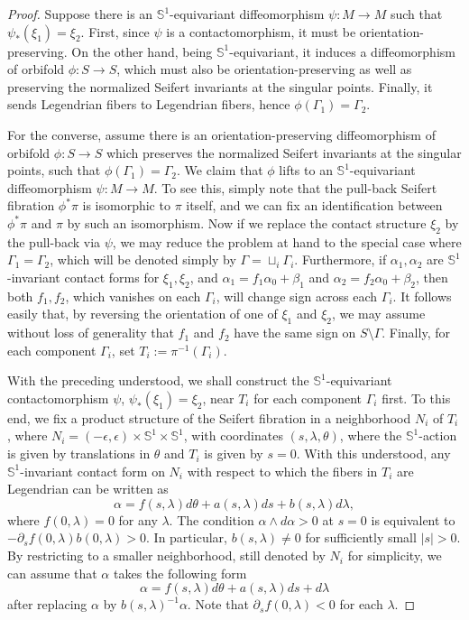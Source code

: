 \documentclass[11pt]{amsart}
\theoremstyle{plain}
\numberwithin{theorem}{section}
\theoremstyle{definition}
\newcommand{\s}{{\mathbb S}}
\begin{document}
\begin{proof}
Suppose there is an $\s^1$-equivariant diffeomorphism $\psi: M\rightarrow M$ such that 
$\psi_\ast(\xi_1)=\xi_2$. First, since $\psi$ is a contactomorphism, it must be orientation-preserving.
On the other hand, being $\s^1$-equivariant, it induces a diffeomorphism of orbifold 
$\phi: S\rightarrow S$, which must also be orientation-preserving as well as preserving the normalized Seifert invariants at the singular points. Finally, it sends Legendrian fibers to Legendrian fibers, 
hence $\phi(\Gamma_1)=\Gamma_2$. 

For the converse, assume there is an orientation-preserving diffeomorphism of orbifold 
$\phi:S\rightarrow S$ which preserves the normalized Seifert invariants at the singular points, 
such that $\phi(\Gamma_1)=\Gamma_2$. We claim that $\phi$ lifts to an $\s^1$-equivariant diffeomorphism $\psi: M\rightarrow M$. To see this, simply note that the pull-back 
Seifert fibration $\phi^\ast \pi$ is isomorphic to $\pi$ itself, and we can fix an identification between 
$\phi^\ast \pi$ and $\pi$ by such an isomorphism. Now if we replace the contact structure $\xi_2$ by the pull-back via $\psi$, we may reduce the problem at hand to the special case where 
$\Gamma_1=\Gamma_2$, which will be denoted simply by $\Gamma=\sqcup_i \Gamma_i$. 
Furthermore, if $\alpha_1,\alpha_2$ are $\s^1$-invariant contact forms for $\xi_1,\xi_2$, and 
$\alpha_1=f_1\alpha_0+\beta_1$ and $\alpha_2=f_2\alpha_0+\beta_2$, then both $f_1,f_2$, which vanishes on each $\Gamma_i$, will change sign across each $\Gamma_i$. It follows easily that, by reversing the orientation of one of $\xi_1$ and $\xi_2$, we may assume without loss of generality that $f_1$ and 
$f_2$ have the same sign on $S\setminus \Gamma$. Finally, for each component $\Gamma_i$, set 
$T_i:=\pi^{-1}(\Gamma_i)$. 

With the preceding understood, we shall construct the $\s^1$-equivariant contactomorphism 
$\psi$, $\psi_\ast(\xi_1)=\xi_2$, near $T_i$ for each component $\Gamma_i$ first. To this end,
we fix a product structure of the Seifert fibration in a neighborhood $N_i$ of $T_i$, where
$N_i=(-\epsilon,\epsilon)\times \s^1\times \s^1$, with coordinates $(s,\lambda,\theta)$, where
the $\s^1$-action is given by translations in $\theta$ and $T_i$ is given by $s=0$. With this understood, any $\s^1$-invariant contact form on $N_i$ with respect to which the fibers in $T_i$
are Legendrian can be written as
$$
\alpha=f(s,\lambda)d\theta+ a(s,\lambda)ds+b(s,\lambda)d\lambda,
$$
where $f(0,\lambda)=0$ for any $\lambda$. The condition $\alpha\wedge d\alpha>0$ at $s=0$
is equivalent to $-\partial_s f(0,\lambda) b(0,\lambda)>0$. In particular, $b(s,\lambda)\neq 0$
for sufficiently small $|s|>0$. By restricting to a smaller neighborhood, still denoted by $N_i$
for simplicity, we can assume that $\alpha$ takes the following form
$$
\alpha=f(s,\lambda)d\theta+ a(s,\lambda)ds+d\lambda
$$
after replacing $\alpha$ by $b(s,\lambda)^{-1}\alpha$. Note that $\partial_s f(0,\lambda)<0$ for each $\lambda$.


\end{proof}
\end{document}

